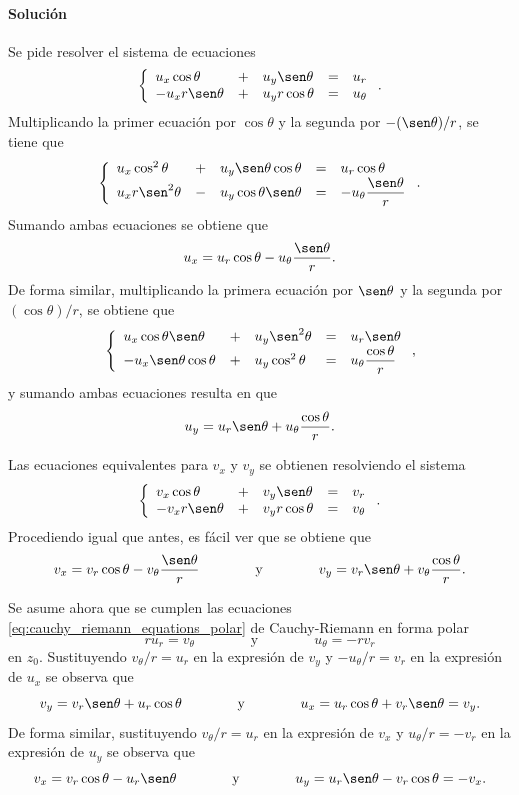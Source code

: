 \documentclass[a4paper]{report}
\begin{document}
\paragraph{Solución} Se pide resolver el sistema de ecuaciones
\[
 \left\{ 
 \begin{array}{lllll}
  u_x\cos\theta&+&u_y\sen\theta&=&u_r\\
 -u_xr\sen\theta&+&u_yr\cos\theta&=&u_\theta
 \end{array}
 \right..
\]
Multiplicando la primer ecuación por \(\cos\theta\) y la segunda por \(-(\sen\theta)/r\), se tiene que 
\[
 \left\{ 
 \begin{array}{lllll}
  u_x\cos^2\theta&+&u_y\sen\theta\cos\theta&=&u_r\cos\theta\\
 u_xr\sen^2\theta&-&u_y\cos\theta\sen\theta&=&-u_\theta\dfrac{\sen\theta}{r}
 \end{array}
 \right..
\]
Sumando ambas ecuaciones se obtiene que 
\[
 u_x=u_r\cos\theta-u_\theta\frac{\sen\theta}{r}.
\]
De forma similar, multiplicando la primera ecuación por \(\sen\theta\) y la segunda por \((\cos\theta)/r\), se obtiene que 
\[
 \left\{ 
 \begin{array}{lllll}
  u_x\cos\theta\sen\theta&+&u_y\sen^2\theta&=&u_r\sen\theta\\
 -u_x\sen\theta\cos\theta&+&u_y\cos^2\theta&=&u_\theta\dfrac{\cos\theta}{r}
 \end{array}
 \right.,
\]
y sumando ambas ecuaciones resulta en que 
\[
 u_y=u_r\sen\theta+u_\theta\frac{\cos\theta}{r}.
\]

Las ecuaciones equivalentes para \(v_x\) y \(v_y\) se obtienen resolviendo el sistema
\[
 \left\{ 
 \begin{array}{lllll}
  v_x\cos\theta&+&v_y\sen\theta&=&v_r\\
  -v_xr\sen\theta&+&v_yr\cos\theta&=&v_\theta
 \end{array}
 \right..
\]
Procediendo igual que antes, es fácil ver que se obtiene que
\begin{equation}\label{eq:polar_coordinates_partial_derivatives_v_inverse}
 v_x=v_r\cos\theta-v_\theta\frac{\sen\theta}{r}
 \qquad\qquad\textrm{y}\qquad\qquad
 v_y=v_r\sen\theta+v_\theta\frac{\cos\theta}{r}. 
\end{equation}

Se asume ahora que se cumplen las ecuaciones \ref{eq:cauchy_riemann_equations_polar} de Cauchy-Riemann en forma polar
\[
 ru_r=v_\theta 
 \qquad\qquad\textrm{y}\qquad\qquad
 u_\theta=-rv_r
\]
en \(z_0\). Sustituyendo \(v_\theta/r=u_r\) en la expresión de \(v_y\) y \(-u_\theta/r=v_r\) en la expresión de \(u_x\) se observa que 
\[
 v_y=v_r\sen\theta+u_r\cos\theta
 \qquad\qquad\textrm{y}\qquad\qquad
 u_x=u_r\cos\theta+v_r\sen\theta=v_y.
\]
De forma similar, sustituyendo \(v_\theta/r=u_r\) en la expresión de \(v_x\) y \(u_\theta/r=-v_r\) en la expresión de \(u_y\) se observa que 
\[
 v_x=v_r\cos\theta-u_r\sen\theta
 \qquad\qquad\textrm{y}\qquad\qquad
 u_y=u_r\sen\theta-v_r\cos\theta=-v_x.
\]
\end{document}
